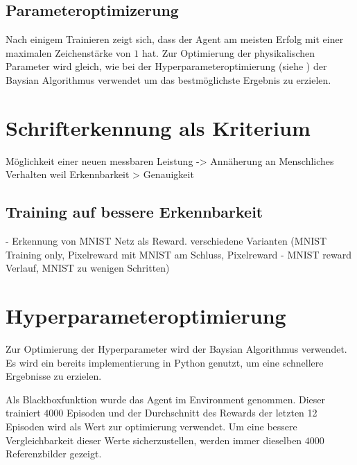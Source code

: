 
\subsection*{Parameteroptimizerung}
Nach einigem Trainieren zeigt sich, dass der Agent am meisten Erfolg mit einer
maximalen Zeichenstärke von $1$ hat. Zur Optimierung der physikalischen
Parameter wird gleich, wie bei der Hyperparameteroptimierung (siehe %
) der Baysian Algorithmus verwendet um
das bestmöglichste Ergebnis zu erzielen.



\section{Schrifterkennung als Kriterium}
Möglichkeit einer neuen messbaren Leistung
-> Annäherung an Menschliches Verhalten weil Erkennbarkeit > Genauigkeit


\subsection*{Training auf bessere Erkennbarkeit}
- Erkennung von MNIST Netz als Reward. 
verschiedene Varianten (MNIST Training only, Pixelreward mit MNIST am Schluss, Pixelreward - MNIST reward Verlauf, MNIST zu wenigen Schritten)


\section{Hyperparameteroptimierung}
\label{chap:Hyperparameter Optimierung}
Zur Optimierung der Hyperparameter wird der Baysian Algorithmus verwendet. Es
wird ein bereits implementierung in Python genutzt, um eine schnellere
Ergebnisse zu erzielen. \cite{fernando_bayesian_2022}

Als Blackboxfunktion wurde das Agent im Environment genommen. Dieser trainiert
$4000$ Episoden und der Durchschnitt des Rewards der letzten 12 Episoden wird
als Wert zur optimierung verwendet. Um eine bessere Vergleichbarkeit dieser
Werte sicherzustellen, werden immer dieselben $4000$ Referenzbilder gezeigt.
